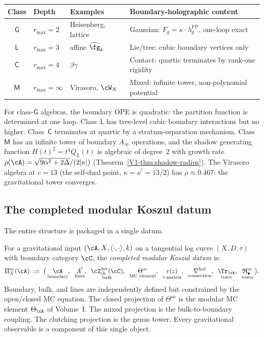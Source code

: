 \begin{center}
\renewcommand{\arraystretch}{1.3}
\begin{tabular}{clll}
\textbf{Class} & \textbf{Depth} & \textbf{Examples}
 & \textbf{Boundary-holographic content} \\
\hline
$\mathsf{G}$ & $r_{\max} = 2$ & Heisenberg, lattice
 & Gaussian: $F_g = \kappa \cdot \lambda_g^{\mathrm{FP}}$,
 one-loop exact \\
$\mathsf{L}$ & $r_{\max} = 3$ & affine $\widehat{\fg}_k$
 & Lie/tree: cubic boundary vertices only \\
$\mathsf{C}$ & $r_{\max} = 4$ & $\beta\gamma$
 & Contact: quartic terminates by rank-one rigidity \\
$\mathsf{M}$ & $r_{\max} = \infty$ & Virasoro, $\cW_N$
 & Mixed: infinite tower, non-polynomial potential \\
\end{tabular}
\end{center}

For class-$\mathsf{G}$ algebras, the boundary OPE is quadratic:
the partition function is determined at one loop. Class~$\mathsf{L}$
has tree-level cubic boundary interactions but no higher.
Class~$\mathsf{C}$ terminates at quartic by a stratum-separation
mechanism. Class~$\mathsf{M}$ has an infinite tower of
boundary $A_\infty$ operations, and the shadow generating function
$H(t)^2 = t^4 Q_L(t)$ is algebraic of degree~$2$ with
growth rate $\rho(\cA) = \sqrt{9\alpha^2 + 2\Delta}/(2|\kappa|)$
(Theorem~\ref*{V1-thm:shadow-radius}). The Virasoro algebra at
$c = 13$ (the self-dual point, $\kappa = \kappa^! = 13/2$) has
$\rho \approx 0.467$: the gravitational tower converges.

\subsection{The completed modular Koszul datum}

The entire structure is packaged in a single datum.

\begin{definition}
\label{def:completed-platonic-v2}
For a gravitational input $(\cA, X, \langle\cdot,\cdot\rangle, k)$
on a tangential log curve $(X, D, \tau)$ with boundary category
$\cC$, the \emph{completed modular Koszul datum} is:
\[
 \Pi^{\mathrm{oc}}_X(\cA)
 \;:=\;
 \bigl(\,
 \underset{\text{boundary}}{\cA},\;\;
 \underset{\text{lines}}{A^!},\;\;
 \underset{\text{bulk}}{\cZ^{\mathrm{der}}_{\mathrm{ch}}(\cC)},\;\;
 \underset{\text{MC element}}{\Theta^{\mathrm{oc}}},\;\;
 \underset{\text{$r$-matrix}}{r(z)},\;\;
 \underset{\text{connection}}{\nabla^{\mathrm{hol}}},\;\;
 \underset{\text{trace}}{\Tr_\cA},\;\;
 \underset{\text{tower}}{\mathfrak{R}^{\mathrm{oc}}_\bullet}
 \,\bigr).
\]
Boundary, bulk, and lines are independently defined but constrained
by the open/closed MC equation. The closed projection of
$\Theta^{\mathrm{oc}}$ is the modular MC element $\Theta_\cA$ of
Volume~I. The mixed projection is the bulk-to-boundary coupling.
The clutching projection is the genus tower. Every gravitational
observable is a component of this single object.
\end{definition}

